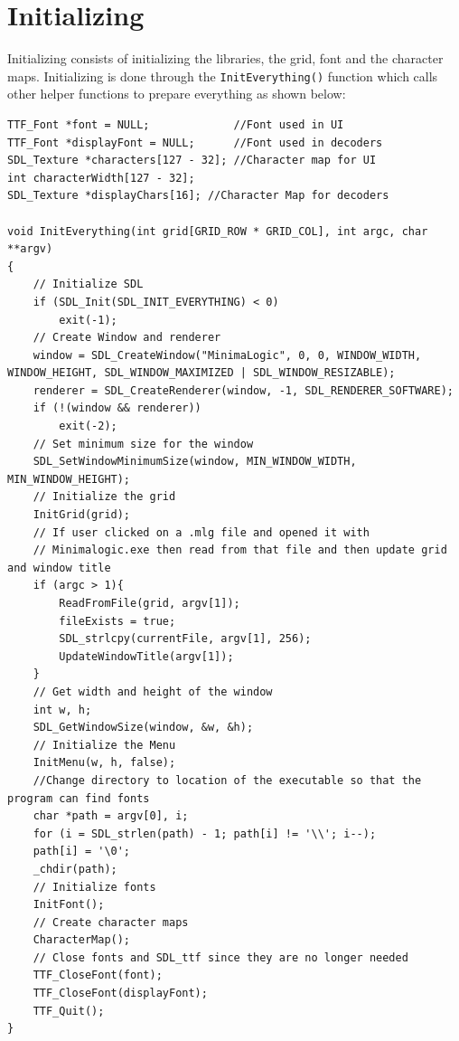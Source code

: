 \documentclass[report]{subfiles}
\begin{document}
    \section{Initializing}
    Initializing consists of initializing the libraries, the grid, font and the character maps. Initializing is done through the \texttt{InitEverything()} function which calls other helper functions to prepare everything as shown below: 
    \begin{lstlisting}
TTF_Font *font = NULL;             //Font used in UI
TTF_Font *displayFont = NULL;      //Font used in decoders
SDL_Texture *characters[127 - 32]; //Character map for UI
int characterWidth[127 - 32];
SDL_Texture *displayChars[16]; //Character Map for decoders

void InitEverything(int grid[GRID_ROW * GRID_COL], int argc, char **argv)
{
    // Initialize SDL
    if (SDL_Init(SDL_INIT_EVERYTHING) < 0)
        exit(-1);
    // Create Window and renderer
    window = SDL_CreateWindow("MinimaLogic", 0, 0, WINDOW_WIDTH, WINDOW_HEIGHT, SDL_WINDOW_MAXIMIZED | SDL_WINDOW_RESIZABLE);
    renderer = SDL_CreateRenderer(window, -1, SDL_RENDERER_SOFTWARE);
    if (!(window && renderer))
        exit(-2);
    // Set minimum size for the window
    SDL_SetWindowMinimumSize(window, MIN_WINDOW_WIDTH, MIN_WINDOW_HEIGHT);
    // Initialize the grid
    InitGrid(grid);
    // If user clicked on a .mlg file and opened it with
    // Minimalogic.exe then read from that file and then update grid and window title
    if (argc > 1){
        ReadFromFile(grid, argv[1]);
        fileExists = true;
        SDL_strlcpy(currentFile, argv[1], 256);
        UpdateWindowTitle(argv[1]);
    }
    // Get width and height of the window
    int w, h;
    SDL_GetWindowSize(window, &w, &h);
    // Initialize the Menu
    InitMenu(w, h, false);
    //Change directory to location of the executable so that the program can find fonts
    char *path = argv[0], i;
    for (i = SDL_strlen(path) - 1; path[i] != '\\'; i--);
    path[i] = '\0';
    _chdir(path);
    // Initialize fonts
    InitFont();
    // Create character maps
    CharacterMap();
    // Close fonts and SDL_ttf since they are no longer needed
    TTF_CloseFont(font);
    TTF_CloseFont(displayFont);
    TTF_Quit();
}
    \end{lstlisting}
\end{document}
